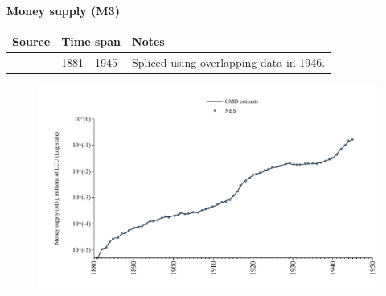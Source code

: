 \documentclass[12pt,a4paper,landscape]{article}
\begin{document}
\begin{adjustbox}{max totalsize={\paperwidth}{\paperheight},center}
\begin{minipage}[t][\textheight][t]{\textwidth}
\vspace*{0.5cm}
{}
\begin{center}
{\Large\bfseries Money supply (M3)}
\end{center}
\vspace{0.5cm}
\begin{table}[H]
\centering
\small
\begin{tabular}{|l|l|l|}
\hline
\textbf{Source} & \textbf{Time span} & \textbf{Notes} \\
\hline
\rowcolor{white}\cite{NBS}& 1881 - 1945 &Spliced using overlapping data in 1946. \\
\hline
\end{tabular}
\end{table}
\begin{figure}[H]
\centering
\includegraphics[width=\textwidth,height=0.6\textheight,keepaspectratio]{graphs/BGR_M3.pdf}
\end{figure}
\end{minipage}
\end{adjustbox}
\end{document}
